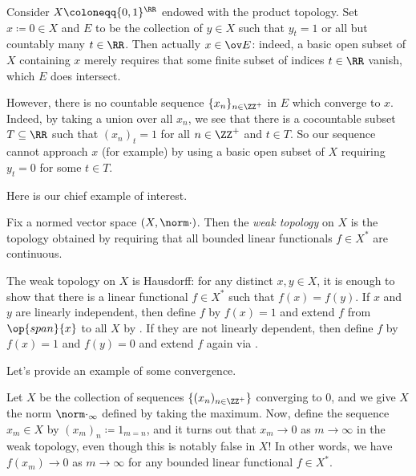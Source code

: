 \documentclass[../notes.tex]{subfiles}
\begin{document}
\begin{example}
	Consider $X\coloneqq\{0,1\}^\RR$ endowed with the product topology. Set $x\coloneqq0\in X$ and $E$ to be the collection of $y\in X$ such that $y_t=1$ or all but countably many $t\in\RR$. Then actually $x\in\ov E$: indeed, a basic open subset of $X$ containing $x$ merely requires that some finite subset of indices $t\in\RR$ vanish, which $E$ does intersect.

	However, there is no countable sequence $\{x_n\}_{n\in\ZZ^+}$ in $E$ which converge to $x$. Indeed, by taking a union over all $x_n$, we see that there is a cocountable subset $T\subseteq\RR$ such that $(x_n)_t=1$ for all $n\in\ZZ^+$ and $t\in T$. So our sequence cannot approach $x$ (for example) by using a basic open subset of $X$ requiring $y_t=0$ for some $t\in T$.
\end{example}
Here is our chief example of interest.
\begin{definition}
	Fix a normed vector space $(X,\norm\cdot)$. Then the \textit{weak topology} on $X$ is the topology obtained by requiring that all bounded linear functionals $f\in X^*$ are continuous.
\end{definition}
\begin{remark}
	The weak topology on $X$ is Hausdorff: for any distinct $x,y\in X$, it is enough to show that there is a linear functional $f\in X^*$ such that $f(x)=f(y)$. If $x$ and $y$ are linearly independent, then define $f$ by $f(x)=1$ and extend $f$ from $\op{span}\{x\}$ to all $X$ by . If they are not linearly dependent, then define $f$ by $f(x)=1$ and $f(y)=0$ and extend $f$ again via .
\end{remark}
Let's provide an example of some convergence.
\begin{example}
	Let $X$ be the collection of sequences $\{(x_n)_{n\in\ZZ^+}\}$ converging to $0$, and we give $X$ the norm $\norm\cdot_\infty$ defined by taking the maximum. Now, define the sequence $x_m\in X$ by $(x_m)_n\coloneqq1_{m=n}$, and it turns out that $x_m\to0$ as $m\to\infty$ in the weak topology, even though this is notably false in $X$! In other words, we have $f(x_m)\to0$ as $m\to\infty$ for any bounded linear functional $f\in X^*$.
\end{example}
\end{document}
